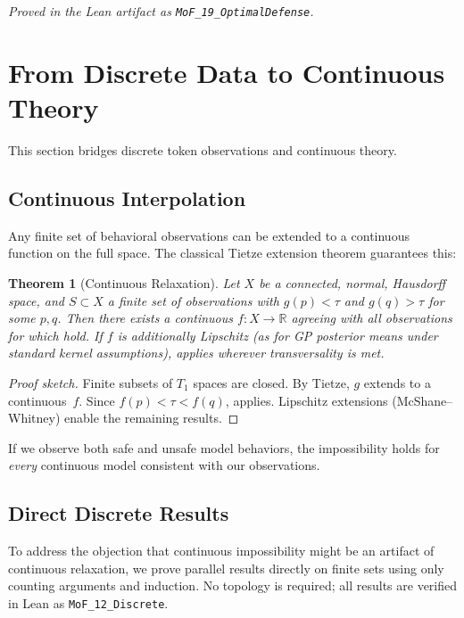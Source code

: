 \documentclass{article}
\newtheorem{theorem}{Theorem}[section]
\newcommand{\R}{\mathbb{R}}
\begin{document}
\noindent\emph{Proved in the Lean artifact as \textup{\texttt{MoF\_19\_OptimalDefense}}.}


\section{From Discrete Data to Continuous Theory}
\label{sec:bridge}

This section bridges discrete token observations and continuous theory.

\subsection{Continuous Interpolation}

Any finite set of behavioral observations can be extended to a
continuous function on the full space. The classical Tietze extension
theorem guarantees this:

\begin{theorem}[Continuous Relaxation]
\label{thm:tietze}
Let $X$ be a connected, normal, Hausdorff space, and $S \subset X$ a
finite set of observations with $g(p) < \tau$ and $g(q) > \tau$ for
some $p, q$. Then there exists a continuous $f\colon X \to \R$ agreeing
with all observations for which  hold.
If $f$ is additionally Lipschitz (as for GP posterior means under
standard kernel assumptions),  applies wherever
transversality is met.
\end{theorem}

\begin{proof}[Proof sketch]
Finite subsets of $T_1$ spaces are closed. By Tietze, $g$ extends to a
continuous~$f$. Since $f(p) < \tau < f(q)$,  applies.
Lipschitz extensions (McShane--Whitney) enable the remaining results.
\end{proof}

If we observe both safe and unsafe model behaviors, the
impossibility holds for \emph{every} continuous model consistent with our observations.

\subsection{Direct Discrete Results}

To address the objection that continuous impossibility might be an
artifact of continuous relaxation, we prove parallel results directly
on finite sets using only counting arguments and induction. No
topology is required; all results are verified in Lean as
\texttt{MoF\_12\_Discrete}.
\end{document}
